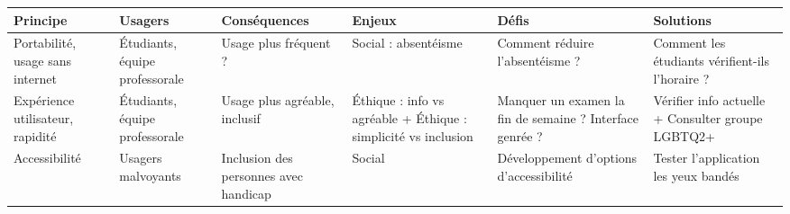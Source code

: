 \begin{tabular}{P{0.15\textwidth}P{0.15\textwidth}P{0.15\textwidth}P{0.15\textwidth}P{0.15\textwidth}P{0.15\textwidth}}
	\hline
	\bf Principe & \bf Usagers & \bf Conséquences & \bf Enjeux & \bf Défis & \bf Solutions \\
	\hline
	\hline
	Portabilité, usage sans internet
	& Étudiants, équipe professorale
	& Usage plus fréquent ?
	& Social : absentéisme
	& Comment réduire l'absentéisme ?
	& Comment les étudiants vérifient-ils l'horaire ?
	\\
	Expérience utilisateur, rapidité
	& Étudiants, équipe professorale
	& Usage plus agréable, inclusif
	& Éthique : info vs agréable + Éthique : simplicité vs inclusion
	& Manquer un examen la fin de semaine ? Interface genrée ?
	& Vérifier info actuelle + Consulter groupe LGBTQ2+
	\\
	Accessibilité
	& Usagers malvoyants
	& Inclusion des personnes avec handicap
	& Social
	& Développement d'options d'accessibilité
	& Tester l'application les yeux bandés
	\\
	\hline
\end{tabular}
